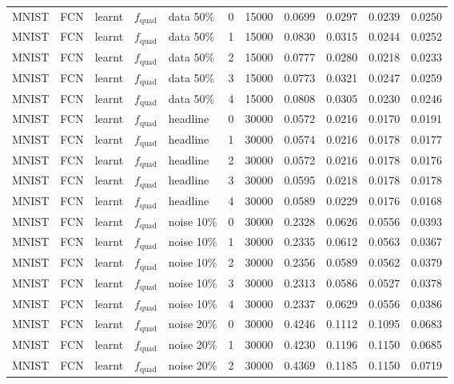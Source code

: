 {\begin{longtable}[]{@{}lllllr r r r r r@{}}
\addlinespace[2pt]
MNIST & FCN & learnt & $f_{\text{quad}}$ & data 50\% & 0 & 15000 & 0.0699 & 0.0297 & 0.0239 & 0.0250 \\
MNIST & FCN & learnt & $f_{\text{quad}}$ & data 50\% & 1 & 15000 & 0.0830 & 0.0315 & 0.0244 & 0.0252 \\
MNIST & FCN & learnt & $f_{\text{quad}}$ & data 50\% & 2 & 15000 & 0.0777 & 0.0280 & 0.0218 & 0.0233 \\
MNIST & FCN & learnt & $f_{\text{quad}}$ & data 50\% & 3 & 15000 & 0.0773 & 0.0321 & 0.0247 & 0.0259 \\
MNIST & FCN & learnt & $f_{\text{quad}}$ & data 50\% & 4 & 15000 & 0.0808 & 0.0305 & 0.0230 & 0.0246 \\
\addlinespace[2pt]
MNIST & FCN & learnt & $f_{\text{quad}}$ & headline & 0 & 30000 & 0.0572 & 0.0216 & 0.0170 & 0.0191 \\
MNIST & FCN & learnt & $f_{\text{quad}}$ & headline & 1 & 30000 & 0.0574 & 0.0216 & 0.0178 & 0.0177 \\
MNIST & FCN & learnt & $f_{\text{quad}}$ & headline & 2 & 30000 & 0.0572 & 0.0216 & 0.0178 & 0.0176 \\
MNIST & FCN & learnt & $f_{\text{quad}}$ & headline & 3 & 30000 & 0.0595 & 0.0218 & 0.0178 & 0.0178 \\
MNIST & FCN & learnt & $f_{\text{quad}}$ & headline & 4 & 30000 & 0.0589 & 0.0229 & 0.0176 & 0.0168 \\
\addlinespace[2pt]
MNIST & FCN & learnt & $f_{\text{quad}}$ & noise 10\% & 0 & 30000 & 0.2328 & 0.0626 & 0.0556 & 0.0393 \\
MNIST & FCN & learnt & $f_{\text{quad}}$ & noise 10\% & 1 & 30000 & 0.2335 & 0.0612 & 0.0563 & 0.0367 \\
MNIST & FCN & learnt & $f_{\text{quad}}$ & noise 10\% & 2 & 30000 & 0.2356 & 0.0589 & 0.0562 & 0.0379 \\
MNIST & FCN & learnt & $f_{\text{quad}}$ & noise 10\% & 3 & 30000 & 0.2313 & 0.0586 & 0.0527 & 0.0378 \\
MNIST & FCN & learnt & $f_{\text{quad}}$ & noise 10\% & 4 & 30000 & 0.2337 & 0.0629 & 0.0556 & 0.0386 \\
\addlinespace[2pt]
MNIST & FCN & learnt & $f_{\text{quad}}$ & noise 20\% & 0 & 30000 & 0.4246 & 0.1112 & 0.1095 & 0.0683 \\
MNIST & FCN & learnt & $f_{\text{quad}}$ & noise 20\% & 1 & 30000 & 0.4230 & 0.1196 & 0.1150 & 0.0685 \\
MNIST & FCN & learnt & $f_{\text{quad}}$ & noise 20\% & 2 & 30000 & 0.4369 & 0.1185 & 0.1150 & 0.0719 \\

\end{longtable}}

